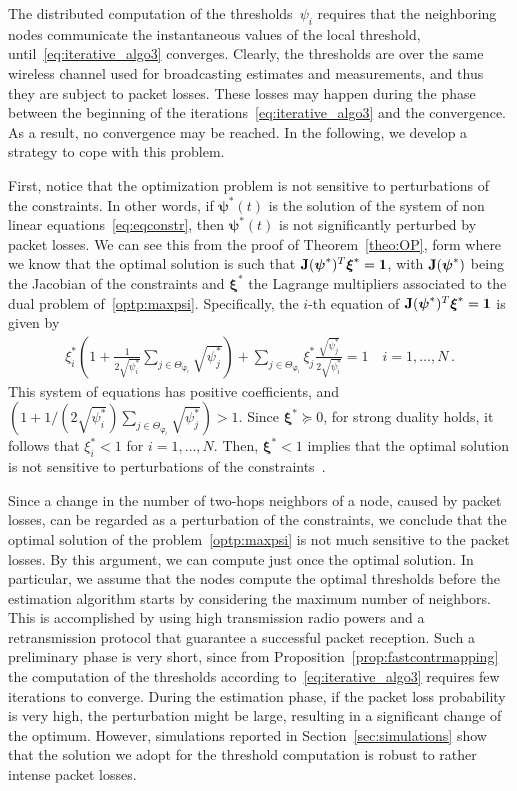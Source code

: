 \documentclass[a4paper,notitlepage,onecolumn]{article}
\def\1{\mathbf{1}}
\def\J{{\bf J}}
\def\psib{\boldsymbol{\psi}}
\def\varphib{\boldsymbol{\varphi}}
\def\xib{\boldsymbol{\xi}}
\numberwithin{equation}{section}
\begin{document}
The distributed computation of the thresholds~$\psi_i$ requires that the
neighboring nodes communicate the instantaneous values of the
local threshold, until~\eqref{eq:iterative_algo3} converges.
Clearly, the thresholds are over the same wireless channel used
for broadcasting estimates and measurements, and thus they are
subject to packet losses. These losses may happen during the phase
between the beginning of the iterations~\eqref{eq:iterative_algo3}
and the convergence. As a result, no convergence may be reached.
In the following, we develop a strategy to cope with this problem.



First, notice that the optimization problem is not sensitive to
perturbations of the constraints. In other words, if $\psib^*(t)$
is the solution of the system of non linear
equations~\eqref{eq:eqconstr}, then $\psib^*(t)$ is not
significantly perturbed by packet losses. We can see this from the
proof of Theorem~\ref{theo:OP}, form where we know that the
optimal solution is such that $\J(\psib^*)^T \xib^* = \1 $, with
$\J(\psib^*)$ being the Jacobian of the constraints and $\xib^*$
the Lagrange multipliers associated to the dual problem
of~\eqref{optp:maxpsi}. Specifically, the $i$-th equation of
$\J(\psib^*)^T \xib^*  = \1 $ is given by
\begin{align} \label{eq:lagrangefunc}
     \xi_i^*\left(1+\frac{1}{2\sqrt{\psi_i^*}}\sum_{j\in \Theta_{\varphib_i}}\sqrt{\psi_j^*}\right)
     + \sum_{j\in \Theta_{\varphib_i}} \xi_j^* \frac{\sqrt{\psi_j^*}}{2\sqrt{\psi_i^*}}= 1 \quad i=1,\dots,N \,.
\end{align}
This system of equations has positive coefficients, and
$\left(1+1/(2\sqrt{\psi_i^*})\sum_{j\in
\Theta_{\varphib_i}}\sqrt{\psi_j^*}\right) > 1$. Since $\xib^*
\succeq 0$, for strong duality holds, it follows that $\xi_i^* <1$
for $i=1,\ldots,N$. Then, $\xib^*<1$ implies that the optimal
solution is not sensitive to perturbations of the
constraints~\cite[pag. 249]{boyd2}.

Since a change in the number of two-hops neighbors of a node,
caused by packet losses, can be regarded as a perturbation of the
constraints, we conclude that the optimal solution of the
problem~\eqref{optp:maxpsi} is not much sensitive to the packet
losses. By this argument, we can compute just once the optimal
solution. In particular, we assume that the nodes compute the
optimal thresholds before the estimation algorithm starts by
considering the maximum number of neighbors. This is accomplished
by using high transmission radio powers and a retransmission
protocol that guarantee a successful packet reception. Such a
preliminary phase is very short, since from
Proposition~\ref{prop:fastcontrmapping} the computation of the
thresholds according to~\eqref{eq:iterative_algo3} requires few
iterations to converge.
During the estimation phase, if the packet loss probability is
very high, the perturbation might be large, resulting in a
significant change of the optimum. However, simulations reported
in Section~\ref{sec:simulations} show that the solution we adopt
for the threshold computation is robust to rather intense packet
losses.
\end{document}
